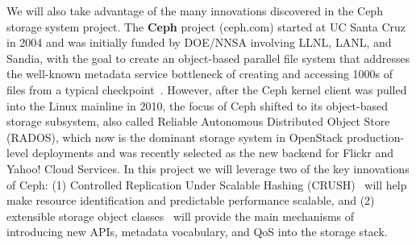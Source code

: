 We will also take advantage of the many innovations discovered in the Ceph~\cite{weil:osdi06} storage
system project. 
%
%
The {\bf Ceph} project (ceph.com) started at UC Santa Cruz in 2004 and was initially
funded by DOE/NNSA involving LLNL, LANL, and Sandia, with the goal to create an
object-based parallel file system that addresses the well-known metadata
service bottleneck of creating and accessing 1000s of files from a typical 
checkpoint~\cite{weil:osdi06}.  However, after the Ceph kernel client was
pulled into the Linux mainline in 2010, the focus of Ceph shifted to its
object-based storage subsystem, also called Reliable Autonomous Distributed
Object Store (RADOS), which now is the dominant storage system in OpenStack
production-level deployments and was recently selected as the new backend for
Flickr and Yahoo! Cloud Services. In this project we will leverage two of the
key innovations of Ceph: (1) Controlled Replication Under Scalable Hashing
(CRUSH)~\cite{weil:sc06} will help make resource identification and
predictable performance scalable, and (2) extensible storage object
classes~\cite{watkins:ucsctr15} will provide the main mechanisms of introducing
new APIs, metadata vocabulary, and QoS into the storage stack.


